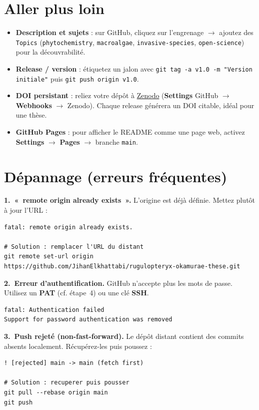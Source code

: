 \documentclass[11pt,a4paper]{article}
\begin{document}
\section{Aller plus loin}
\begin{itemize}
  \item \textbf{Description et sujets} : sur GitHub, cliquez sur l'engrenage
        $\rightarrow$ ajoutez des \texttt{Topics} (\texttt{phytochemistry},
        \texttt{macroalgae}, \texttt{invasive-species}, \texttt{open-science}) pour la
        découvrabilité.
  \item \textbf{Release / version} : étiquetez un jalon avec
        \texttt{git tag -a v1.0 -m "Version initiale"} puis \texttt{git push origin v1.0}.
  \item \textbf{DOI persistant} : reliez votre dépôt à \href{https://zenodo.org}{Zenodo}
        (\textbf{Settings} GitHub $\rightarrow$ \textbf{Webhooks} $\rightarrow$ Zenodo).
        Chaque release générera un DOI citable, idéal pour une thèse.
  \item \textbf{GitHub Pages} : pour afficher le README comme une page web, activez
        \textbf{Settings} $\rightarrow$ \textbf{Pages} $\rightarrow$ branche \texttt{main}.
\end{itemize}

\section{Dépannage (erreurs fréquentes)}

\textbf{1.~«~remote origin already exists~».} L'origine est déjà définie. Mettez plutôt
à jour l'URL :
\begin{lstlisting}
fatal: remote origin already exists.

# Solution : remplacer l'URL du distant
git remote set-url origin https://github.com/JihanElkhattabi/rugulopteryx-okamurae-these.git
\end{lstlisting}

\textbf{2.~Erreur d'authentification.} GitHub n'accepte plus les mots de passe.
Utilisez un \textbf{PAT} (cf. étape~4) ou une clé \textbf{SSH}.
\begin{lstlisting}
fatal: Authentication failed
Support for password authentication was removed
\end{lstlisting}

\textbf{3.~Push rejeté (non-fast-forward).} Le dépôt distant contient des commits
absents localement. Récupérez-les puis poussez :
\begin{lstlisting}
! [rejected] main -> main (fetch first)

# Solution : recuperer puis pousser
git pull --rebase origin main
git push
\end{lstlisting}
\end{document}
